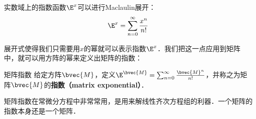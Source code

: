 
实数域上的指数函数$\E^x$可以进行Maclaulin展开：\begin{equation}
\E^x=\sum\limits_{n=0}^\infty \frac{x^n}{n!}
\end{equation}

展开式使得我们只需要用$x$的幂就可以表示指数$\E^x$．我们把这一点应用到矩阵中，就可以用方阵的幂来定义出矩阵的指数：

\begin{definition}{矩阵指数}
给定方阵$\bvec{M}$，定义$\E^\bvec{M}=\sum_{n=0}^\infty \frac{\bvec{M}^n}{n!}$，并称之为矩阵$\bvec{M}$的\textbf{指数（matrix exponential）}．
\end{definition}

矩阵指数在常微分方程中非常常用，是用来解线性齐次方程组的利器．一个矩阵的指数本身还是一个矩阵．






